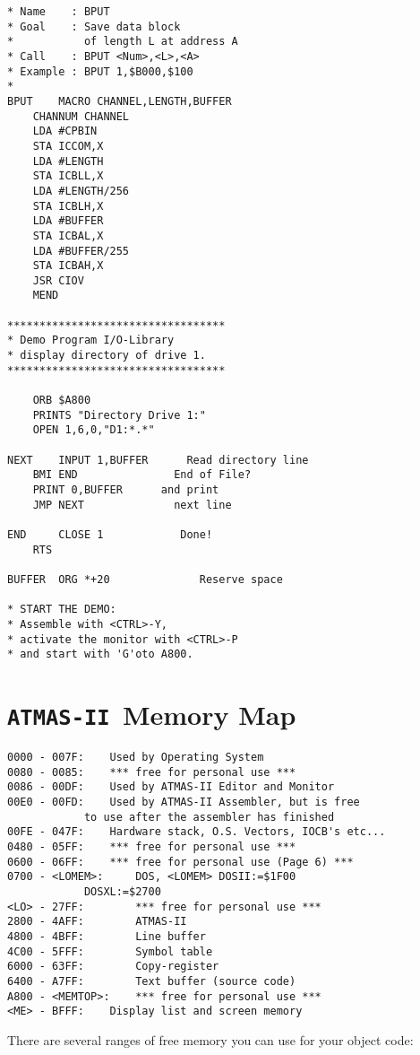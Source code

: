 \documentclass[10pt,a4paper,twoside,final,openright,titlepage]{memoir}
\def\atmas{\texttt{AT\-MAS-II }}
\begin{document}
\begin{Verbatim}
* Name    : BPUT
* Goal    : Save data block
*           of length L at address A
* Call    : BPUT <Num>,<L>,<A>
* Example : BPUT 1,$B000,$100
*
BPUT    MACRO CHANNEL,LENGTH,BUFFER
	CHANNUM CHANNEL
	LDA #CPBIN
	STA ICCOM,X
	LDA #LENGTH
	STA ICBLL,X
	LDA #LENGTH/256
	STA ICBLH,X
	LDA #BUFFER
	STA ICBAL,X
	LDA #BUFFER/255
	STA ICBAH,X
	JSR CIOV
	MEND

**********************************
* Demo Program I/O-Library
* display directory of drive 1.
**********************************

	ORB $A800
	PRINTS "Directory Drive 1:"
	OPEN 1,6,0,"D1:*.*"

NEXT    INPUT 1,BUFFER		Read directory line
	BMI END 		      End of File?
	PRINT 0,BUFFER		and print
	JMP NEXT		      next line

END     CLOSE 1		       Done!
	RTS

BUFFER  ORG *+20		      Reserve space

* START THE DEMO:
* Assemble with <CTRL>-Y,
* activate the monitor with <CTRL>-P 
* and start with 'G'oto A800.
\end{Verbatim}

\appendix

\chapter{\atmas Memory Map}

\begin{Verbatim}
0000 - 007F:	Used by Operating System
0080 - 0085:	*** free for personal use ***
0086 - 00DF:	Used by ATMAS-II Editor and Monitor
00E0 - 00FD:	Used by ATMAS-II Assembler, but is free
		    to use after the assembler has finished
00FE - 047F:	Hardware stack, O.S. Vectors, IOCB's etc...
0480 - 05FF:	*** free for personal use ***
0600 - 06FF:	*** free for personal use (Page 6) ***
0700 - <LOMEM>:     DOS, <LOMEM> DOSII:=$1F00
		    DOSXL:=$2700
<LO> - 27FF:        *** free for personal use ***
2800 - 4AFF:        ATMAS-II
4800 - 4BFF:        Line buffer
4C00 - 5FFF:        Symbol table
6000 - 63FF:        Copy-register
6400 - A7FF:        Text buffer (source code)
A800 - <MEMTOP>:    *** free for personal use ***
<ME> - BFFF:	Display list and screen memory
\end{Verbatim}

There are several ranges of free memory you can use for your object code:
\end{document}
